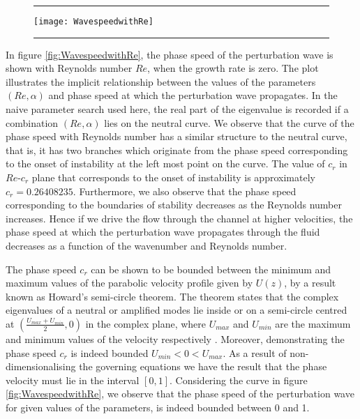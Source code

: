 \documentclass[a4paper, 12pt, twoside, openright]{article}
\numberwithin{equation}{section}
\begin{document}
\begin{figure}[h]
\centering
\rule{\linewidth}{1.5pt}
\texttt{[image: WavespeedwithRe]} 
\rule{\linewidth}{1.5pt}
\end{figure}

In figure \ref{fig:WavespeedwithRe}, the phase speed of the perturbation wave is shown with Reynolds number $Re$, when the growth rate is zero. The plot illustrates the implicit relationship between the values of the parameters $(Re,\alpha)$ and phase speed at which the perturbation wave propagates. In the naive parameter search used here, the real part of the eigenvalue is recorded if a combination $(Re,\alpha)$ lies on the neutral curve. We observe that the curve of the phase speed with Reynolds number has a similar structure to the neutral curve, that is, it has two branches which originate from the phase speed corresponding to the onset of instability at the left most point on the curve. The value of $c_r$ in $Re$-$c_r$ plane that corresponds to the onset of instability is approximately $c_r=0.26408235$. Furthermore, we also observe that the phase speed corresponding to the boundaries of stability decreases as the Reynolds number increases. Hence if we drive the flow through the channel at higher velocities, the phase speed at which the perturbation wave propagates through the fluid decreases as a function of the wavenumber and Reynolds number. %

The phase speed $c_r$ can be shown to be bounded between the minimum and maximum values of the parabolic velocity profile given by $U(z)$, by a result known as Howard's semi-circle theorem. The theorem states that the complex eigenvalues of a neutral or amplified modes lie inside or on a semi-circle centred at $(\frac{U_{max}+U_{min}}{2},0)$ in the complex plane, where $U_{max}$ and $U_{min}$ are the maximum and minimum values of the velocity respectively \citep{Howard61}. Moreover, demonstrating the phase speed $c_r$ is indeed bounded $U_{min} < 0 < U_{max}$. As a result of non-dimensionalising the governing equations we have the result that the phase velocity must lie in the interval $[0,1]$. Considering the curve in figure \ref{fig:WavespeedwithRe}, we observe that the phase speed of the perturbation wave for given values of the parameters, is indeed bounded between 0 and 1. %
\end{document}
